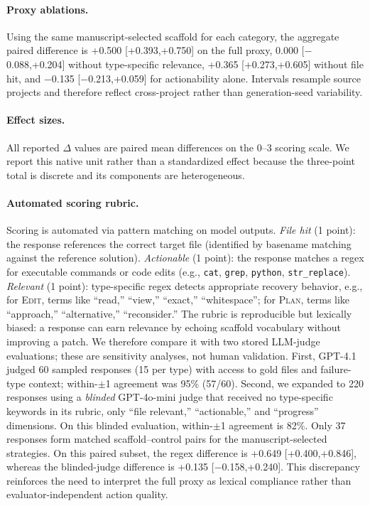 \documentclass{article}
\begin{document}
\paragraph{Proxy ablations.}
Using the same manuscript-selected scaffold for each category, the aggregate
paired difference is +0.500 [+0.393,+0.750] on the full proxy, 0.000
[$-$0.088,+0.204] without type-specific relevance, +0.365
[+0.273,+0.605] without file hit, and $-$0.135 [$-$0.213,+0.059] for
actionability alone.  Intervals resample source projects and therefore reflect
cross-project rather than generation-seed variability.

\paragraph{Effect sizes.}
All reported $\Delta$ values are paired mean differences on the 0--3 scoring
scale.  We report this native unit rather than a standardized effect because the
three-point total is discrete and its components are heterogeneous.

\paragraph{Automated scoring rubric.}
Scoring is automated via pattern matching on model outputs.
\textit{File hit} (1 point): the response references the correct target file (identified by basename matching against the reference solution).
\textit{Actionable} (1 point): the response matches a regex for executable commands or code edits (e.g., \texttt{cat}, \texttt{grep}, \texttt{python}, \texttt{str\_replace}).
\textit{Relevant} (1 point): type-specific regex detects appropriate recovery behavior, e.g., for \textsc{Edit}, terms like ``read,'' ``view,'' ``exact,'' ``whitespace''; for \textsc{Plan}, terms like ``approach,'' ``alternative,'' ``reconsider.''
The rubric is reproducible but lexically biased: a response can earn relevance
by echoing scaffold vocabulary without improving a patch.
We therefore compare it with two stored LLM-judge evaluations; these are
sensitivity analyses, not human validation.
First, GPT-4.1 judged 60 sampled responses (15 per type) with access to gold files and failure-type context; within-$\pm$1 agreement was 95\% (57/60).
Second, we expanded to 220 responses using a \textit{blinded} GPT-4o-mini judge that received no type-specific keywords in its rubric, only ``file relevant,'' ``actionable,'' and ``progress'' dimensions.
On this blinded evaluation, within-$\pm$1 agreement is 82\%.  Only 37 responses
form matched scaffold--control pairs for the manuscript-selected strategies.
On this paired subset, the regex difference is +0.649
[+0.400,+0.846], whereas the blinded-judge difference is +0.135
[$-$0.158,+0.240].  This discrepancy reinforces the need to interpret the full
proxy as lexical compliance rather than evaluator-independent action quality.
\end{document}
